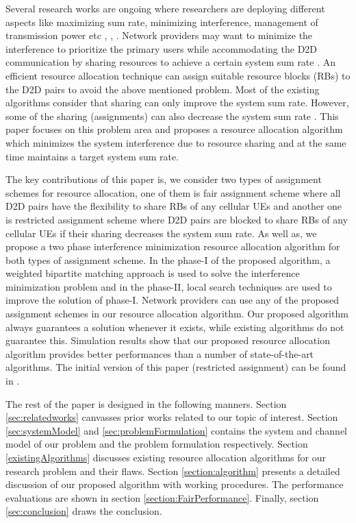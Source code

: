 \documentclass{ieeeaccess}
\begin{document}
\smallskip
\noindent
Several research works are ongoing where researchers are deploying different aspects like maximizing sum rate, minimizing interference, management of transmission power etc \cite{lora}, \cite{zulhasnine}, \cite{islam2016radio}. Network providers may want to minimize the interference to prioritize the primary users while accommodating the D2D communication by sharing resources to achieve a certain system sum rate \cite{islam2016radio, islam2015reducing}. An efficient resource allocation technique can assign suitable resource blocks (RBs) to the D2D pairs to avoid the above mentioned problem. Most of the existing algorithms consider that sharing can only improve the system sum rate. However, some of the sharing (assignments) can also decrease the system sum rate \cite{ccnc}. This paper focuses on this problem area and proposes a resource allocation algorithm which minimizes the system interference due to resource sharing and at the same time maintains a target system sum rate. 

\smallskip
 
The key contributions of this paper is, we consider two types of assignment schemes for resource allocation, one of them is fair assignment scheme where all D2D pairs have the flexibility to share RBs of any cellular UEs and another one is restricted assignment scheme where D2D pairs are blocked to share RBs of any cellular UEs if their sharing decreases the system sum rate. As well as, we propose a two phase interference minimization resource allocation algorithm for both types of assignment scheme. In the phase-I of the proposed algorithm, a weighted bipartite matching approach is used to solve the interference minimization problem and in the phase-II, local search techniques are used to improve the solution of phase-I. Network providers can use any of the proposed assignment schemes in our resource allocation algorithm. Our proposed algorithm always guarantees a solution whenever it exists, while existing algorithms do not guarantee this. Simulation results show that our proposed resource allocation algorithm provides better performances than a number of state-of-the-art algorithms. The initial version of this paper (restricted assignment) can be found in \cite{icc}.
 
\smallskip
 
The rest of the paper is designed in the following manners. Section \ref{sec:relatedworks} canvasses prior works related to our topic of interest. Section \ref{sec:systemModel} and \ref{sec:problemFormulation} contains the system and channel model of our problem and the problem formulation respectively. Section \ref{existingAlgorithms} discusses existing resource allocation algorithms for our research problem and their flaws. Section \ref{section:algorithm} presents a detailed discussion of our proposed algorithm with working procedures. The performance evaluations are  shown in section \ref{section:FairPerformance}. Finally, section \ref{sec:conclusion} draws the conclusion.
\end{document}
